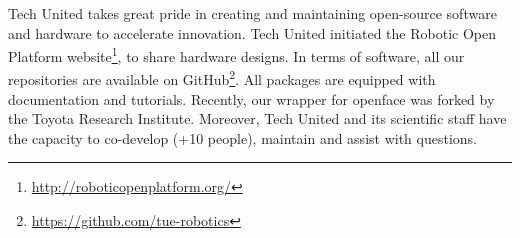 Tech United takes great pride in creating and maintaining open-source software and hardware to accelerate innovation. Tech United initiated the Robotic Open Platform website\footnote{\url{http://roboticopenplatform.org/}}, to share hardware designs. In terms of software, all our repositories are available on GitHub\footnote{\url{https://github.com/tue-robotics}}. All packages are equipped with documentation and tutorials. Recently, our wrapper for openface was forked by the Toyota Research Institute. Moreover, Tech United and its scientific staff have the capacity to co-develop (+10 people), maintain and assist with questions.